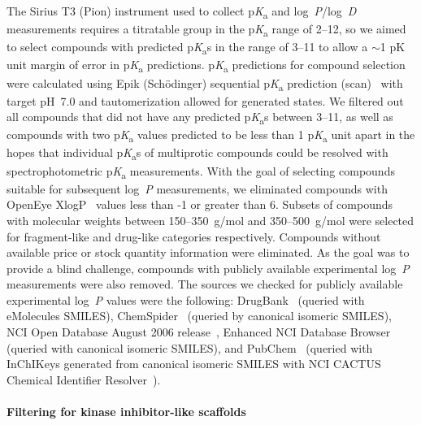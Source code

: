 \documentclass[9pt,lineno]{elife}
\newcommand{\pKa}{p\textit{K}\textsubscript{a}}
\newcommand{\logD}{log~\textit{D}}
\newcommand{\logP}{log~\textit{P}}
\begin{document}
The Sirius T3 (Pion) instrument used to collect \pKa{} and \logP{}/\logD{} measurements requires a titratable group in the \pKa{} range of 2--12, so we aimed to select compounds with predicted \pKa{}s in the range of 3--11 to allow a $\sim$1 pK unit margin of error in \pKa{} predictions. 
\pKa{} predictions for compound selection were calculated using Epik (Sch\"{o}dinger) sequential \pKa{} prediction (scan)~\citep{shelley_epik:_2007,schrodinger_epik_v3_8} with target pH~7.0 and tautomerization allowed for generated states. 
We filtered out all compounds that did not have any predicted \pKa{}s between 3--11, as well as compounds with two \pKa{} values predicted to be less than 1 \pKa{} unit apart in the hopes that individual \pKa{}s of multiprotic compounds could be resolved with spectrophotometric \pKa{} measurements. 
With the goal of selecting compounds suitable for subsequent \logP{} measurements, we eliminated compounds with OpenEye XlogP~\citep{oemolprop_openeye_2017} values less than -1 or greater than 6. 
Subsets of compounds with molecular weights between 150--350~g/mol and 350--500~g/mol were selected for fragment-like and drug-like categories respectively. 
Compounds without available price or stock quantity information were eliminated. 
As the goal was to provide a blind challenge, compounds with publicly available experimental \logP{} measurements were also removed.
The sources we checked for publicly available experimental \logP{} values were the following: DrugBank~\citep{wishart_drugbank:_2006} (queried with eMolecules SMILES), ChemSpider~\citep{pence_chemspider:_2010} (queried by canonical isomeric SMILES), NCI Open Database August 2006 release~\citep{nci_open_database_2006}, Enhanced NCI Database Browser~\citep{nci_database_browser} (queried with canonical isomeric SMILES), and PubChem~\citep{kim_pubchem_2016} (queried with InChIKeys generated from canonical isomeric SMILES with NCI CACTUS Chemical Identifier Resolver~\citep{nci_chem_id_resolver}).

\paragraph{Filtering for kinase inhibitor-like scaffolds}
\end{document}
